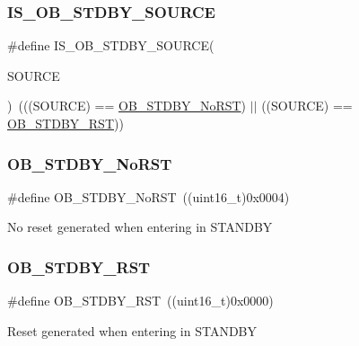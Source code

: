 \subsubsection{\texorpdfstring{IS\_OB\_STDBY\_SOURCE}{IS\_OB\_STDBY\_SOURCE}}
{\footnotesize\ttfamily \#define I\+S\+\_\+\+O\+B\+\_\+\+S\+T\+D\+B\+Y\+\_\+\+S\+O\+U\+R\+CE(\begin{DoxyParamCaption}\item[{}]{S\+O\+U\+R\+CE }\end{DoxyParamCaption})~(((S\+O\+U\+R\+CE) == \mbox{\hyperlink{group___option___bytes__n_r_s_t___s_t_d_b_y_ga9588443b20719498422aeb72b65de839}{O\+B\+\_\+\+S\+T\+D\+B\+Y\+\_\+\+No\+R\+ST}}) $\vert$$\vert$ ((S\+O\+U\+R\+CE) == \mbox{\hyperlink{group___option___bytes__n_r_s_t___s_t_d_b_y_ga69451a6f69247528f58735c9c83499ce}{O\+B\+\_\+\+S\+T\+D\+B\+Y\+\_\+\+R\+ST}}))}

\mbox{\label{group___option___bytes__n_r_s_t___s_t_d_b_y_ga9588443b20719498422aeb72b65de839}} 
\subsubsection{\texorpdfstring{OB\_STDBY\_NoRST}{OB\_STDBY\_NoRST}}
{\footnotesize\ttfamily \#define O\+B\+\_\+\+S\+T\+D\+B\+Y\+\_\+\+No\+R\+ST~((uint16\+\_\+t)0x0004)}

No reset generated when entering in S\+T\+A\+N\+D\+BY \mbox{\label{group___option___bytes__n_r_s_t___s_t_d_b_y_ga69451a6f69247528f58735c9c83499ce}} 
\subsubsection{\texorpdfstring{OB\_STDBY\_RST}{OB\_STDBY\_RST}}
{\footnotesize\ttfamily \#define O\+B\+\_\+\+S\+T\+D\+B\+Y\+\_\+\+R\+ST~((uint16\+\_\+t)0x0000)}

Reset generated when entering in S\+T\+A\+N\+D\+BY 